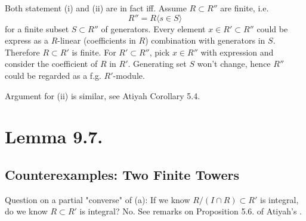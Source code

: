 Both statement (i) and (ii) are in fact iff.
Assume $R\subset R''$ are finite, i.e. \[R''=R\langle s\in S\rangle\] for a finite subset $S\subset R''$ of generators. Every element $x\in R'\subset R''$ could be express as a $R$-linear (coefficients in $R$) combination with generators in $S$. Therefore $R\subset R'$ is finite. For $R'\subset R''$, pick $x\in R''$ with expression and consider the coefficient of $R$ in $R'$. Generating set $S$ won't change, hence $R''$ could be regarded as a f.g. $R'$-module.

Argument for (ii) is similar, see Atiyah \cite{atiyah1994introduction} Corollary 5.4.

\section{Lemma 9.7.}

\subsection{Counterexamples: Two Finite Towers}

Question on a partial "converse" of (a): If we know $R/(I\cap R)\subset R'$ is integral, do we know $R\subset R'$ is integral? No. See remarks on Proposition 5.6. of Atiyah's \cite{atiyah1994introduction}.